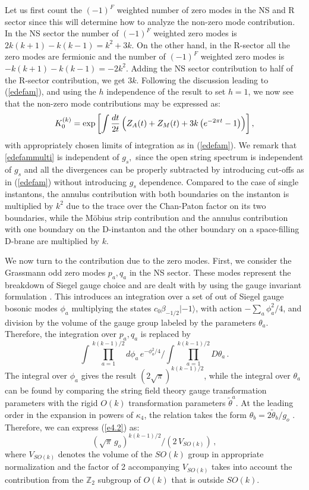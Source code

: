 \documentclass[12pt,a4paper]{article}
\newcommand{\be}{\begin{equation}}
\newcommand{\ee}{\end{equation}}
\newcommand{\refb}[1]{(\ref{#1})}
\newcommand{\IZ}{\mathds{Z}}
\def\({\left(}
\def\){\right)}
\def\[{\left[}
\def\]{\right]}
\newcommand{\wt}{\widetilde}
\def\KKZ{K_0}
\begin{document}
Let us first count the $(-1)^F$ weighted
number of zero modes in the NS and R sector since this will determine how to analyze the non-zero
mode contribution. In the NS sector the number of $(-1)^F$ weighted zero modes is
$2k(k+1)- k(k-1)=k^2+3k$. On the other hand, in the R-sector all the zero modes are fermionic
and the number of $(-1)^F$ weighted zero modes is $-k(k+1)-k(k-1)=-2k^2$.
Adding the NS sector contribution to half of the R-sector contribution, we get $3k$.
Following the discussion leading to \refb{edefam}, and using the $h$ independence of the
result to set $h=1$, we now see that the non-zero mode contributions may be
expressed as:
\be\label{edefammulti}
\KKZ^{(k)}=
\exp\[\int {dt\over 2t} \,\Bigl( Z_A(t) + Z_M(t) + 3k\( e^{-2\pi  t} -1\) \Bigr) \] ,
\ee
with appropriately chosen limits of integration as in \refb{edefam}.
We remark that \eqref{edefammulti} is independent of $g_s,$ since
the open string spectrum is independent of $g_s$ and all the divergences can be
properly subtracted by introducing cut-offs as in \refb{edefam} without introducing $g_s$ dependence.
Compared to the case of single instantons,  the annulus contribution with both
boundaries on the instanton is multiplied by
$k^2$ due to the trace over the Chan-Paton factor on its two boundaries, while the
M\"{o}bius strip contribution and the annulus contribution with one boundary on the
D-instanton and the other boundary on a space-filling D-brane
are multiplied by $k$.

We now turn to the contribution due to the zero modes. First, we consider the Grassmann
odd zero modes $p_a,q_a$ in the NS sector. These modes represent the breakdown of Siegel
gauge choice and are dealt with by using the gauge invariant formulation \cite{Sen:2021qdk}.
This introduces an integration over a set of out of Siegel gauge bosonic modes $\phi_a$ multiplying the
states $c_0 \beta_{-1/2}|-1\rangle$, with action $-\sum_a\phi_a^2/4$, and division by the
volume of the gauge group labeled by the parameters $\theta_a$.
Therefore, the integration over $p_a,q_a$ is replaced by
\be\label{e4.2}
\int \prod_{a=1}^{k(k-1)/2} d\phi_a \, e^{-\phi_a^2/4} \bigg/ \int \prod_{a=1}^{k(k-1)/2}D\theta_a\, .
\ee
The integral over $\phi_a$ gives the result $(2\sqrt\pi)^{k(k-1)/2}$, while the integral over
$\theta_a$ can be found by comparing the string field theory gauge transformation parameters
with the rigid $O(k)$ transformation parameters $\wt\theta^a$.
At the leading order in the expansion in powers of $\kappa_4$, the relation takes the
form $\theta_b=2\wt\theta_b/g_o$ \cite{Sen:2021qdk}. Therefore, we can express
\refb{e4.2} as:
\be\label{e4.3}
(\sqrt{\pi}\, g_o)^{k(k-1)/2} / (2\, V_{SO(k)})\, ,
\ee
where $V_{SO(k)}$ denotes the volume of the $SO(k)$ group in appropriate normalization and the
factor of 2 accompanying $V_{SO(k)}$
takes into account the contribution from the $\IZ_2$ subgroup of $O(k)$ that is
outside $SO(k)$.
\end{document}
